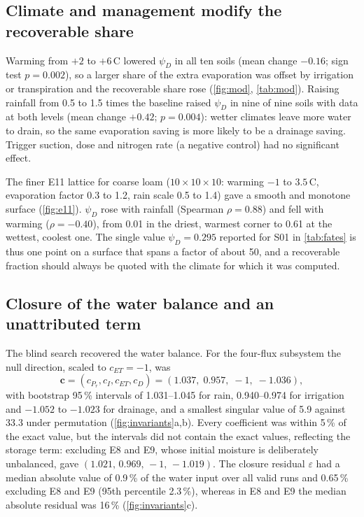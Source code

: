 \documentclass[review,12pt,authoryear]{elsarticle}
\begin{document}
\subsection{Climate and management modify the recoverable share}
\label{sec:mod}
Warming from $+2$ to $+6$\,\textdegree C lowered $\psi_D$ in all ten soils (mean change $-0.16$; sign test $p=0.002$), so a larger share of the extra evaporation was offset by irrigation or transpiration and the recoverable share rose (\cref{fig:mod}, \cref{tab:mod}). Raising rainfall from 0.5 to 1.5 times the baseline raised $\psi_D$ in nine of nine soils with data at both levels (mean change $+0.42$; $p=0.004$): wetter climates leave more water to drain, so the same evaporation saving is more likely to be a drainage saving. Trigger suction, dose and nitrogen rate (a negative control) had no significant effect.

The finer E11 lattice for coarse loam ($10\times10\times10$: warming $-1$ to $3.5$\,\textdegree C, evaporation factor 0.3 to 1.2, rain scale 0.5 to 1.4) gave a smooth and monotone surface (\cref{fig:e11}). $\psi_D$ rose with rainfall (Spearman $\rho=0.88$) and fell with warming ($\rho=-0.40$), from 0.01 in the driest, warmest corner to 0.61 at the wettest, coolest one. The single value $\psi_D=0.295$ reported for S01 in \cref{tab:fates} is thus one point on a surface that spans a factor of about 50, and a recoverable fraction should always be quoted with the climate for which it was computed.


\subsection{Closure of the water balance and an unattributed term}
\label{sec:resultsB}
The blind search recovered the water balance. For the four-flux subsystem the null direction, scaled to $c_{\mathit{ET}}=-1$, was
\begin{equation}
\mathbf c=(c_{P_r},c_I,c_{\mathit{ET}},c_D)=(1.037,\;0.957,\;-1,\;-1.036),
\label{eq:law}
\end{equation}
with bootstrap 95\,\% intervals of 1.031--1.045 for rain, 0.940--0.974 for irrigation and $-1.052$ to $-1.023$ for drainage, and a smallest singular value of 5.9 against 33.3 under permutation (\cref{fig:invariants}a,b). Every coefficient was within 5\,\% of the exact value, but the intervals did not contain the exact values, reflecting the storage term: excluding E8 and E9, whose initial moisture is deliberately unbalanced, gave $(1.021,\,0.969,\,-1,\,-1.019)$. The closure residual $\varepsilon$ had a median absolute value of 0.9\,\% of the water input over all valid runs and 0.65\,\% excluding E8 and E9 (95th percentile 2.3\,\%), whereas in E8 and E9 the median absolute residual was 16\,\% (\cref{fig:invariants}c).
\end{document}
